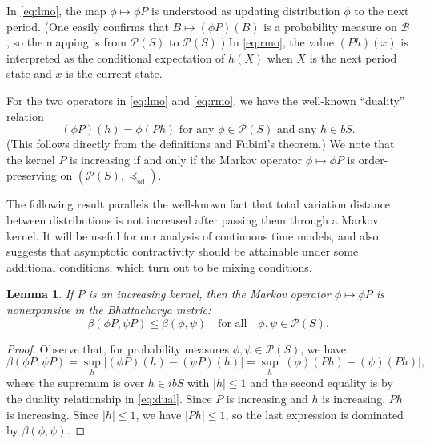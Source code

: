 \documentclass[12pt,reqno]{amsart}
\numberwithin{equation}{section}
\newtheorem{lemma}{Lemma}[section]
\theoremstyle{definition}
\newcommand{\1}{\mathbbm{1}}
\newcommand{\bB}{\mathscr{B}}
\newcommand{\pP}{\mathscr{P}}
\newcommand{\precsd}{\preceq_{\textrm{sd}}}
\begin{document}
In \eqref{eq:lmo}, the map $\phi \mapsto \phi P$ is understood as updating
distribution $\phi$ to the next period. (One easily confirms that $B \mapsto
(\phi P)(B)$ is a probability measure on $\bB$, so the mapping is from $\pP(S)$
to $\pP(S)$.) In \eqref{eq:rmo}, the value $(Ph)(x)$ is interpreted as the
conditional expectation of $h(X)$ when $X$ is the next period state and $x$ is
the current state.

For the two operators in \eqref{eq:lmo} and \eqref{eq:rmo},
we have the well-known ``duality'' relation
%
\begin{equation}\label{eq:dual}
    \text{$(\phi P)(h) = \phi(Ph)$ for any $\phi \in \pP(S)$ and any $h \in bS$}.
\end{equation}
%
(This follows directly from the definitions and Fubini's theorem.) We note that the kernel $P$ is increasing if and only
if the Markov operator $\phi \mapsto \phi P$ is order-preserving on $(\pP(S),
\precsd)$.

The following result parallels the well-known fact that total variation distance
between distributions is not increased after passing them through a Markov
kernel.  It will be useful for our analysis of continuous time models, and also
suggests that asymptotic contractivity should be attainable under some
additional conditions, which turn out to be mixing conditions.

\begin{lemma}\label{lem:nonexp}
    If $P$ is an increasing kernel, then the Markov operator $\phi \mapsto \phi
    P$ is nonexpansive in the Bhattacharya metric:
    \begin{equation}
        \beta(\phi P, \psi P) \leq \beta(\phi, \psi)
        \quad \text{for all} \quad 
        \phi, \psi \in \pP(S).
    \end{equation}
\end{lemma}

\begin{proof}
    Observe that, for probability measures $\phi, \psi \in \pP(S)$, we have
    \begin{equation*}
        \beta(\phi P, \psi P) 
        = \sup_h \left| (\phi P)(h) - (\psi P)(h) \right|
        = \sup_h \left| (\phi )(Ph) - (\psi )(Ph) \right|,
    \end{equation*}
    where the supremum is over $h \in ibS$ with $|h| \leq 1$ and the second equality is by the
    duality relationship in \eqref{eq:dual}. Since $P$ is increasing and $h$ is
    increasing, $Ph$ is increasing. Since $|h|
    \leq 1$, we have $|Ph| \leq 1$, so the last expression is dominated by 
    $\beta(\phi, \psi)$.
\end{proof}
\end{document}
